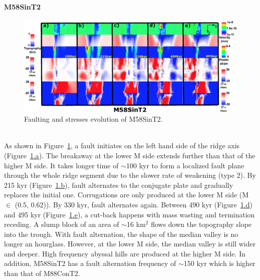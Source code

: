 \paragraph{M58SinT2}\label{para_M58SinT2}

\begin{figure}[h]
 \centering
  \includegraphics[width=1.0\textwidth]{./Figures/fig_Results_Weakening_6_M58SinT2_time_evolution.eps}
 \caption{Faulting and stresses evolution of M58SinT2.}
\label{fig_Results_Weakenging_6}
\end{figure}

~\\
As shown in Figure~\hyperref[fig_Results_Weakenging_6]{\ref{fig_Results_Weakenging_6}}, a fault initiates on the left hand side of the ridge axis (Figure~\hyperref[fig_Results_Weakenging_6]{\ref{fig_Results_Weakenging_6}.a}). The breakaway at the lower M side extends further than that of the higher M side. It takes longer time of $\sim$100 kyr to form a localized fault plane through the whole ridge segment due to the slower rate of weakening (type 2). By 215 kyr (Figure~\hyperref[fig_Results_Weakenging_6]{\ref{fig_Results_Weakenging_6}.b}), fault alternates to the conjugate plate and gradually replaces the initial one. Corrugations are only produced at the lower M side (M $\in$ (0.5, 0.62)). By 330 kyr, fault alternates again. Between 490 kyr (Figure~\hyperref[fig_Results_Weakenging_6]{\ref{fig_Results_Weakenging_6}.d}) and 495 kyr (Figure~\hyperref[fig_Results_Weakenging_6]{\ref{fig_Results_Weakenging_6}.e}), a cut-back happens with mass wasting and termination receding. A slump block of an area of $\sim$16 km$^{2}$ flows down the topography slope into the trough. With fault alternation, the shape of the median valley is no longer an hourglass. However, at the lower M side, the median valley is still wider and deeper. High frequency abyssal hills are produced at the higher M side. In addition, M58SinT2 has a fault alternation frequency of $\sim$150 kyr which is higher than that of M88ConT2. 

